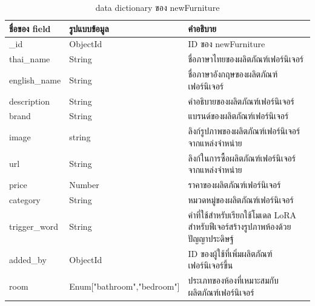 \documentclass[12pt,oneside,openright,a4paper]{cpe-thai-project}
\begin{document}
\clearpage
\begin{table}[ht!]
  \caption{data dictionary ของ newFurniture }\label{tbl:er-table6}
  \begin{tabular}{|p{2.5cm}|p{6cm}|p{6cm}|}
    \hline
    \textbf{ชื่อของ field} & \textbf{รูปแบบข้อมูล}                       & \textbf{คำอธิบาย}                                             \\
    \hline
    \_id                 & ObjectId                                 & ID ของ newFurniture                                         \\
    \hline
    thai\_name           & String                                   & ชื่อภาษาไทยของผลิตภัณฑ์เฟอร์นิเจอร์                                 \\
    \hline
    english\_name        & String                                   & ชื่อภาษาอังกฤษของผลิตภัณฑ์เฟอร์นิเจอร์                               \\
    \hline
    description          & String                                   & คำอธิบายของผลิตภัณฑ์เฟอร์นิเจอร์                                    \\
    \hline
    brand                & String                                   & แบรนด์ของผลิตภัณฑ์เฟอร์นิเจอร์                                     \\
    \hline
    image                & string                                   & ลิงก์รูปภาพของผลิตภัณฑ์เฟอร์นิเจอร์จากแหล่งจำหน่าย                      \\
    \hline
    url                  & String                                   & ลิงก์ในการซื้อผลิตภัณฑ์เฟอร์นิเจอร์จากแหล่งจำหน่าย                       \\
    \hline
    price                & Number                                   & ราคาของผลิตภัณฑ์เฟอร์นิเจอร์                                      \\
    \hline
    category             & String                                   & หมวดหมู่ของผลิตภัณฑ์เฟอร์นิเจอร์                                    \\
    \hline
    trigger\_word        & String                                   & คำที่ใช้สำหรับเรียกใช้โมเดล LoRA สำหรับฟีเจอร์สร้างรูปภาพห้องด้วยปัญญาประดิษฐ์ \\
    \hline
    added\_by            & ObjectId                                 & ID ของผู้ใช้ที่เพิ่มผลิตภัณฑ์เฟอร์นิเจอร์ขึ้น                              \\
    \hline
    room                 & Enum["bathroom","bedroom"]               & ประเภทของห้องที่เหมาะสมกับผลิตภัณฑ์เฟอร์นิเจอร์                       \\

\end{tabular}
\end{table}
\end{document}
